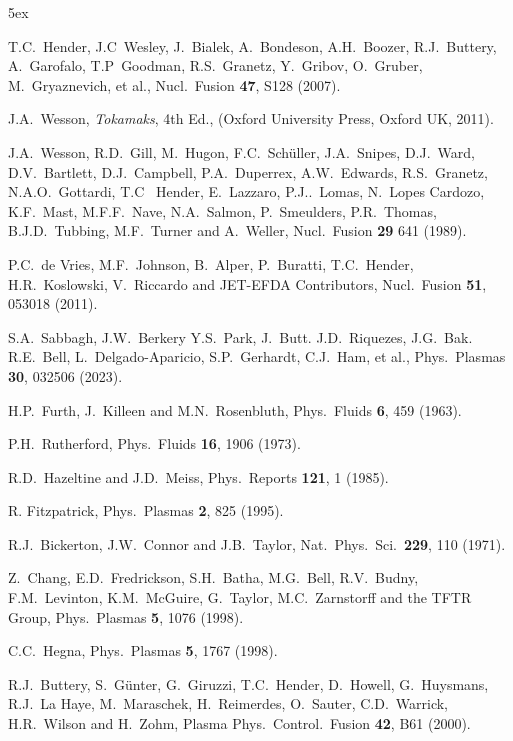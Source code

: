 \documentclass[12pt,prb,aps]{revtex4-1}
\begin{document}
\begin{thebibliography}{99}\baselineskip 5ex

 T.C.~Hender, J.C~Wesley, J.~Bialek, A.~Bondeson, A.H.~Boozer, R.J.~Buttery, A.~Garofalo, T.P~Goodman, R.S.~Granetz, Y.~Gribov, O.~Gruber, 
M.~Gryaznevich, et al., Nucl.\  Fusion {\bf 47}, S128 (2007).

 J.A.~Wesson, {\em Tokamaks}, 4th Ed., (Oxford University Press, Oxford UK, 2011).

 J.A.~Wesson, R.D.~Gill, M.~Hugon, F.C.~Sch\"{u}ller, J.A.~Snipes, D.J.~Ward, D.V.~Bartlett, D.J.~Campbell, P.A.~Duperrex, A.W.~Edwards, 
R.S.~Granetz, N.A.O.~Gottardi, T.C~ Hender, E.~Lazzaro, P.J..~Lomas, N.~Lopes Cardozo, K.F.~Mast, M.F.F.~Nave, N.A.~Salmon, P.~Smeulders, 
P.R.~Thomas, B.J.D.~Tubbing, M.F.~Turner and A.~Weller, Nucl.\ Fusion {\bf 29} 641 (1989). 

 P.C.~de Vries, M.F.~Johnson, B.~Alper, P.~Buratti, T.C.~Hender, H.R.~Koslowski, V.~Riccardo and JET-EFDA Contributors,  Nucl.\ Fusion {\bf 51},  053018 (2011).

 S.A.~Sabbagh, J.W.~Berkery  Y.S.~Park, J.~Butt. J.D.~Riquezes, J.G.~Bak. R.E.~Bell, L.~Delgado-Aparicio, S.P.~Gerhardt, C.J.~Ham,
et al., Phys.\ Plasmas {\bf 30}, 032506 (2023).

 H.P.~Furth,  J.~Killeen and M.N.~Rosenbluth,  Phys.\ Fluids {\bf 6}, 459 (1963).

 P.H.~Rutherford, Phys.\ Fluids {\bf 16}, 1906 (1973).

 R.D.~Hazeltine and J.D.~Meiss, Phys.\ Reports {\bf 121}, 1 (1985).

 R. Fitzpatrick, Phys.\ Plasmas {\bf 2}, 825 (1995).

 R.J.~Bickerton, J.W.~Connor and J.B.~Taylor, Nat.\ Phys.\ Sci.\ {\bf 229}, 110 (1971). 

 Z.~Chang,  E.D.~Fredrickson, S.H.~Batha,  M.G.~Bell,  R.V.~Budny,  F.M.~Levinton, K.M.~McGuire, G.~Taylor,  M.C.~Zarnstorff and the  TFTR Group, Phys.\ Plasmas {\bf 5}, 1076  (1998).

 C.C.~Hegna, Phys.\ Plasmas {\bf 5}, 1767 (1998).

 R.J.~Buttery, S.~G\"{u}nter, G.~Giruzzi, T.C.~Hender, D.~Howell, G.~Huysmans, R.J.~La Haye, M.~Maraschek, H.~Reimerdes, O.~Sauter,
 C.D.~Warrick, H.R.~Wilson and H.~Zohm, Plasma Phys.\ Control.\ Fusion {\bf 42}, B61 (2000).
 

\end{thebibliography}
\end{document}
